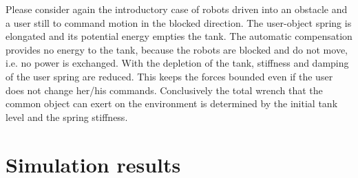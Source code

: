 \documentclass[a4paper,twoside, openright,12pt]{report}
\begin{document}
Please consider again the introductory case of robots driven into an obstacle and a user still to command motion in the blocked direction. The user-object spring is elongated and its potential energy empties the tank. The automatic compensation provides no energy to the tank, because the robots are blocked and do not move, i.e. no power is exchanged. With the depletion of the tank, stiffness and damping of the user spring are reduced. This keeps the forces bounded even if the user does not change her/his commands. Conclusively the total wrench that the common object can exert on the environment is determined by the initial tank level and the spring stiffness. 





\chapter{Simulation results}
\end{document}
